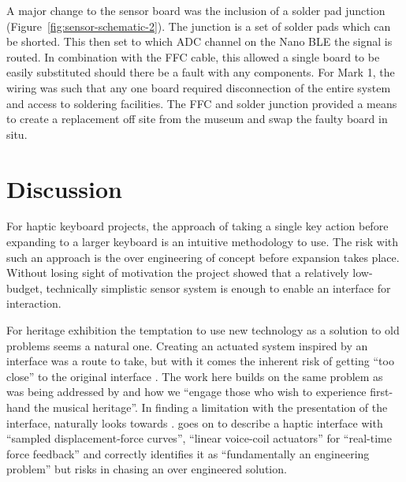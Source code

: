 A major change to the sensor board was the inclusion of a solder pad junction (Figure~\ref{fig:sensor-schematic-2}). The junction is a set of solder pads which can be shorted. This then set to which ADC channel on the Nano BLE the signal is routed. In combination with the FFC cable, this allowed a single board to be easily substituted should there be a fault with any components. For Mark 1, the wiring was such that any one board required disconnection of the entire system and access to soldering facilities. The FFC and solder junction provided a means to create a replacement off site from the museum and swap the faulty board in situ.



\section{Discussion}\label{discussion-interaction}


For haptic keyboard projects, the approach of taking a single key action before expanding to a larger keyboard is an intuitive methodology to use.  The risk with such an approach is the over engineering of concept before expansion takes place. Without losing sight of motivation the project showed that a relatively low-budget, technically simplistic sensor system is enough to enable an interface for interaction. 


For heritage exhibition the temptation to use new technology as a solution to old problems seems a natural one.  Creating an actuated system inspired by an interface was a route to take, but with it comes the inherent risk of getting ``too close'' to the original interface \textcite{michon_hybrid_2018}. The work here builds on the same problem as was being addressed by \textcite{mcalpine_sampling_2014} and how we ``engage those who wish to experience first-hand the musical heritage''. In finding a limitation with the presentation of the interface, \textcite{mcalpine_sampling_2014} naturally looks towards \textcite{gillespie_haptic_1996}. \textcite{mcalpine_sampling_2014} goes on to describe a haptic interface with ``sampled displacement-force curves'', ``linear voice-coil actuators'' for ``real-time force feedback'' and correctly identifies it as ``fundamentally an engineering problem'' but risks in chasing an over engineered solution. 

